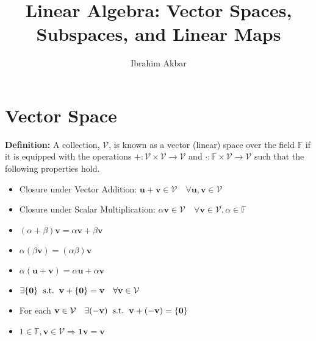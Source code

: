 \documentclass[a4paper]{article}
\begin{document}
\title{Linear Algebra: Vector Spaces, Subspaces, and Linear Maps}
\author{Ibrahim Akbar\\}
\maketitle

\section{Vector Space}
\textbf{Definition:} A collection, $\mathcal{V}$, is known as a vector (linear) space over the field $\mathbb{F}$ if it is equipped with the operations $+:\mathcal{V}\times\mathcal{V} \rightarrow \mathcal{V}$ and $\cdot:\mathbb{F}\times\mathcal{V}\rightarrow\mathcal{V}$ such that the following properties hold.\\

\begin{itemize}
\item Closure under Vector Addition:  $\mathbf{u + v} \in \mathcal{V} \quad \forall \mathbf{u,v} \in \mathcal{V}$
\item Closure under Scalar Multiplication:  $\alpha \mathbf{v} \in \mathcal{V}  \quad \forall \mathbf{v} \in \mathcal{V}, \alpha \in \mathbb{F}$
\item $(\alpha + \beta)\mathbf{v} = \alpha \mathbf{v} + \beta \mathbf{v}$
\item $\alpha(\beta\mathbf{v}) = (\alpha\beta)\mathbf{v}$
\item $\alpha(\mathbf{u + v}) = \alpha\mathbf{u} + \alpha\mathbf{v} $
\item $\exists \{\mathbf{0}\} \hspace{2mm} \textnormal{s.t.} \hspace{2mm} \mathbf{v} +\{\mathbf{0}\} = \mathbf{v} \quad \forall\mathbf{v}\in\mathcal{V}$
\item For each $\mathbf{v}\in\mathcal{V}\quad\exists \mathbf{(-v)}\hspace{2mm} \textnormal{s.t.} \hspace{2mm} \mathbf{v} +\mathbf{(-v)} = \{\mathbf{0}\}$
\item $1\in\mathbb{F},\mathbf{v}\in\mathcal{V} \Rightarrow \mathbf{1v} = \mathbf{v}$
\end{itemize}
\end{document}
